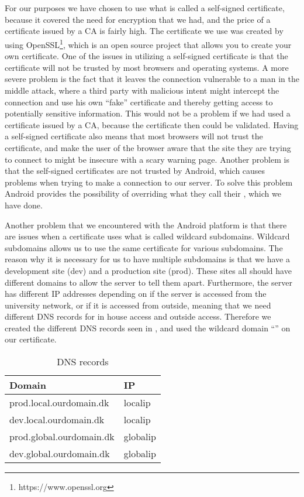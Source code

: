 \\\\
For our purposes we have chosen to use what is called a self-signed certificate, because it covered the need for encryption that we had, and the price of a certificate issued by a CA is fairly high. The certificate we use was created by using OpenSSL\footnote{https://www.openssl.org}, which is an open source project that allows you to create your own certificate. One of the issues in utilizing a self-signed certificate is that the certificate will not be trusted by most browsers and operating systems. A more severe problem is the fact that it leaves the connection vulnerable to a man in the middle attack, where a third party with malicious intent might intercept the connection and use his own ``fake'' certificate and thereby getting access to potentially sensitive information. This would not be a problem if we had used a certificate issued by a CA, because the certificate then could be validated. Having a self-signed certificate also means that most browsers will not trust the certificate, and make the user of the browser aware that the site they are trying to connect to might be insecure with a scary warning page. 
Another problem is that the self-signed certificates are not trusted by Android, which causes problems when trying to make a connection to our server. To solve this problem Android provides the possibility of overriding what they call their , which we have done. 


Another problem that we encountered with the Android platform is that there are issues when a certificate uses what is called wildcard subdomains. Wildcard subdomains allows us to use the same certificate for various subdomains. The reason why it is necessary for us to have multiple subdomains is that we have a development site (dev) and a production site (prod). These sites all should have different domains to allow the server to tell them apart. Furthermore, the server has different IP addresses depending on if the server is accessed from the university network, or if it is accessed from outside, meaning that we need different DNS records for in house access and outside access. Therefore we created the different DNS records seen in , and used the wildcard domain ``'' on our certificate.

\begin{table}[!htbp]
	\centering
	\begin{tabular}{|l|l|} \hline
		\textbf{Domain}				& \textbf{IP}	\\ \hline
		prod.local.ourdomain.dk 	& localip		\\ \hline 
		dev.local.ourdomain.dk 		& localip		\\ \hline
		prod.global.ourdomain.dk 	& globalip		\\ \hline
		dev.global.ourdomain.dk 	& globalip		\\ \hline
	\end{tabular}
	\caption{DNS records}
	\label{tab:dns}
\end{table}

